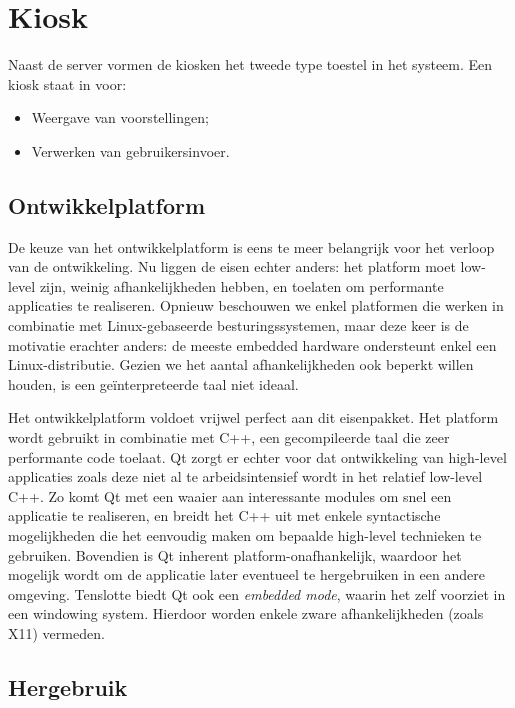 \section{Kiosk}
\label{ontwerp:applicatie:kiosk}

Naast de server vormen de kiosken het tweede type toestel in het systeem. Een kiosk staat in voor:
\begin{itemize}
\item Weergave van voorstellingen;
\item Verwerken van gebruikersinvoer.
\end{itemize}

\subsection{Ontwikkelplatform}

De keuze van het ontwikkelplatform is eens te meer belangrijk voor het verloop van de ontwikkeling. Nu liggen de eisen echter anders: het platform moet low-level zijn, weinig afhankelijkheden hebben, en toelaten om performante applicaties te realiseren. Opnieuw beschouwen we enkel platformen die werken in combinatie met Linux-gebaseerde besturingssystemen, maar deze keer is de motivatie erachter anders: de meeste embedded hardware ondersteunt enkel een Linux-distributie. Gezien we het aantal afhankelijkheden ook beperkt willen houden, is een geïnterpreteerde taal niet ideaal.

Het ontwikkelplatform  voldoet vrijwel perfect aan dit eisenpakket. Het platform wordt gebruikt in combinatie met C++, een gecompileerde taal die zeer performante code toelaat. Qt zorgt er echter voor dat ontwikkeling van high-level applicaties zoals deze niet al te arbeidsintensief wordt in het relatief low-level C++. Zo komt Qt met een waaier aan interessante modules om snel een applicatie te realiseren, en breidt het C++ uit met enkele syntactische mogelijkheden die het eenvoudig maken om bepaalde high-level technieken te gebruiken. Bovendien is Qt inherent platform-onafhankelijk, waardoor het mogelijk wordt om de applicatie later eventueel te hergebruiken in een andere omgeving. Tenslotte biedt Qt ook een \emph{embedded mode}, waarin het zelf voorziet in een windowing system. Hierdoor worden enkele zware afhankelijkheden (zoals X11) vermeden.

\subsection{Hergebruik}

